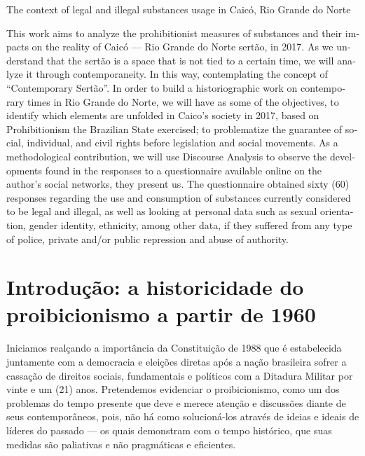 \begin{refsection}
    
    \begin{otherlanguage}{english}
    
    \fakeChapterOneLine
    {The context of legal and illegal substances usage in Caicó, Rio Grande do Norte}

    \begin{galoResumo}[Abstract]
        This work aims to analyze the prohibitionist measures of substances and their impacts on the reality of Caicó --- Rio Grande do Norte sertão, in 2017. As we understand that the sertão is a space that is not tied to a certain time, we will analyze it through contemporaneity. In this way, contemplating the concept of ``Contemporary Sertão''. In order to build a historiographic work on contemporary times in Rio Grande do Norte, we will have as some of the objectives, to identify which elements are unfolded in Caico's society in 2017, based on Prohibitionism the Brazilian State exercised; to problematize the guarantee of social, individual, and civil rights before legislation and social movements. As a methodological contribution, we will use Discourse Analysis to observe the developments found in the responses to a questionnaire available online on the author's social networks, they present us. The questionnaire obtained sixty (60) responses regarding the use and consumption of substances currently considered to be legal and illegal, as well as looking at personal data such as sexual orientation, gender identity, ethnicity, among other data, if they suffered from any type of police, private and/or public repression and abuse of authority.
    \end{galoResumo}
    
    \end{otherlanguage}

    \section{Introdução: a historicidade do proibicionismo a partir de 1960}

    Iniciamos realçando a importância da Constituição de 1988 que é estabelecida juntamente com a democracia e eleições diretas após a nação brasileira sofrer a cassação de direitos sociais, fundamentais e políticos com a Ditadura Militar por vinte e um (21) anos. Pretendemos evidenciar o proibicionismo, como um dos problemas do tempo presente que deve e merece atenção e discussões diante de seus contemporâneos, pois, não há como solucioná-los através de ideias e ideais de líderes do passado --- os quais demonstram com o tempo histórico, que suas medidas são paliativas e não pragmáticas e eficientes.


\end{refsection}
